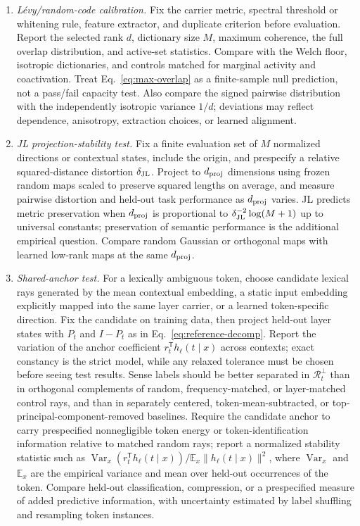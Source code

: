 \documentclass[
  aps,
  reprint,
  superscriptaddress,
  floatfix,
  nofootinbib,
  longbibliography
]{revtex4-2}
\newcommand{\E}{\mathbb{E}}
\newcommand{\Msem}{M}
\newcommand{\T}{^{\mathsf{T}}}
\newcommand{\norm}[1]{\lVert #1 \rVert}
\DeclareMathOperator{\Var}{Var}
\begin{document}
\begin{enumerate}
\item \emph{L\'evy/random-code calibration.}
Fix the carrier metric, spectral threshold or whitening rule, feature extractor,
and duplicate criterion before evaluation.  Report the selected rank $d$,
dictionary size $\Msem$, maximum coherence, the full overlap distribution, and
active-set statistics.  Compare with the Welch floor, isotropic dictionaries,
and controls matched for marginal activity and coactivation.  Treat
Eq.~\eqref{eq:max-overlap} as a finite-sample null prediction, not a pass/fail
capacity test.  Also compare the signed pairwise distribution with the
independently isotropic variance $1/d$; deviations may reflect dependence,
anisotropy, extraction choices, or learned alignment.

\item \emph{JL projection-stability test.}
Fix a finite evaluation set of $\Msem$ normalized directions or contextual
states, include the origin, and prespecify a relative squared-distance
distortion $\delta_{\rm JL}$.  Project to $d_{\rm proj}$ dimensions using
frozen random maps scaled to preserve squared lengths on average, and measure
pairwise distortion and held-out task
performance as $d_{\rm proj}$ varies.  JL predicts metric preservation when
$d_{\rm proj}$ is proportional to
$\delta_{\rm JL}^{-2}\log(\Msem+1)$ up to universal constants; preservation of
semantic performance is the additional empirical question.  Compare random
Gaussian or orthogonal maps with learned low-rank maps at the same
$d_{\rm proj}$.

\item \emph{Shared-anchor test.}
For a lexically ambiguous token, choose candidate lexical rays generated
by the mean contextual embedding, a static input embedding explicitly mapped
into the same layer carrier,
or a learned token-specific direction.  Fix the candidate on training data,
then project held-out layer states with $P_t$ and $I-P_t$ as in
Eq.~\eqref{eq:reference-decomp}.  Report the variation of the anchor coefficient
$r_t\T h_\ell(t\mid x)$ across contexts; exact constancy is the strict model,
while any relaxed tolerance must be chosen before seeing test results.  Sense labels
should be better separated in $\mathcal R_t^\perp$ than in orthogonal
complements of random, frequency-matched, or layer-matched control rays, and
than in separately centered, token-mean-subtracted, or
top-principal-component-removed baselines.  Require the candidate anchor to
carry prespecified nonnegligible token energy or token-identification
information relative to matched random rays; report a normalized stability
statistic such as
$\Var_x(r_t\T h_\ell(t\mid x))/\E_x\norm{h_\ell(t\mid x)}^2$,
where $\Var_x$ and $\E_x$ are the empirical variance and mean over held-out
occurrences of the token.
Compare held-out classification, compression, or a prespecified measure of
added predictive information, with uncertainty estimated by label shuffling
and resampling token instances.


\end{enumerate}
\end{document}
